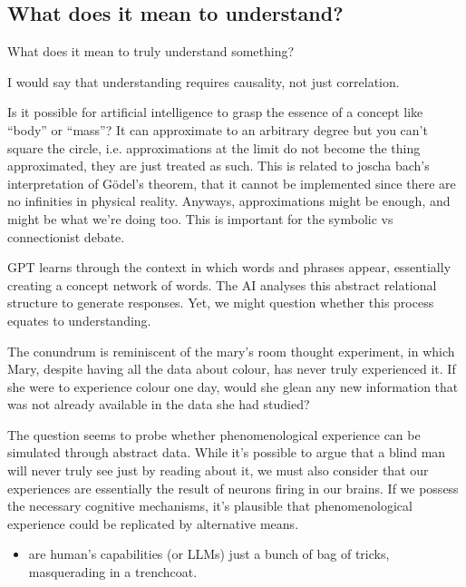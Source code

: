 \subsection{What does it mean to understand?}
What does it mean to truly understand something? 

I would say that understanding requires causality, not just correlation. 

Is it possible for artificial intelligence to grasp the essence of a concept like “body” or “mass”? It can approximate to an arbitrary degree but you can't square the circle, i.e. approximations at the limit do not become the thing approximated, they are just treated as such. This is related to joscha bach's interpretation of Gödel's theorem, that it cannot be implemented since there are no infinities in physical reality. Anyways, approximations might be enough, and might be what we're doing too. This is important for the symbolic vs connectionist debate.

GPT learns through the context in which words and phrases appear, essentially creating a concept network of words. The AI analyses this abstract relational structure to generate responses. Yet, we might question whether this process equates to understanding.

The conundrum is reminiscent of the mary's room thought experiment, in which Mary, despite having all the data about colour, has never truly experienced it. If she were to experience colour one day, would she glean any new information that was not already available in the data she had studied?

The question seems to probe whether phenomenological experience can be simulated through abstract data. While it's possible to argue that a blind man will never truly see just by reading about it, we must also consider that our experiences are essentially the result of neurons firing in our brains. If we possess the necessary cognitive mechanisms, it's plausible that phenomenological experience could be replicated by alternative means.


\begin{itemize}
    \item are human's capabilities (or LLMs) just a bunch of bag of tricks, masquerading in a trenchcoat.
\end{itemize}


